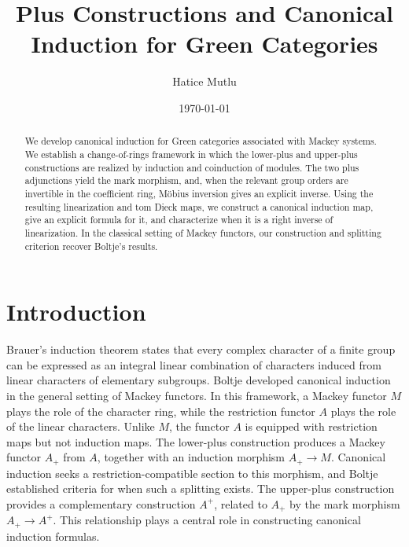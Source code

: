 \documentclass{amsart}
\title{Plus Constructions and Canonical Induction for Green Categories}
\author{Hatice Mutlu}
\date{\today}
\numberwithin{equation}{section}%
\theoremstyle{remark}
\theoremstyle{definition}
\begin{document}
\maketitle
\small

\begin{abstract}\normalsize
We develop canonical induction for Green categories associated with
Mackey systems. We establish a change-of-rings framework in which the
lower-plus and upper-plus constructions are realized by induction and
coinduction of modules. The two plus adjunctions yield the mark
morphism, and, when the relevant group orders are invertible in the
coefficient ring, M\"obius inversion gives an explicit inverse.
Using the resulting linearization and tom Dieck maps, we construct a
canonical induction map, give an explicit formula for it, and
characterize when it is a right inverse of linearization. In the 
classical setting of Mackey functors, our construction and splitting 
criterion recover Boltje's results.
\end{abstract}


%
\tableofcontents


\section{Introduction}
\label{sec:introduction}

Brauer's induction theorem states that every complex character of a
finite group can be expressed as an integral linear combination of
characters induced from linear characters of elementary subgroups.
Boltje \cite{Boltje98a} developed canonical induction in the general
setting of Mackey functors. In this framework, a Mackey functor $M$
plays the role of the character ring, while the restriction functor
$A$ plays the role of the linear characters. Unlike $M$, the functor
$A$ is equipped with restriction maps but not induction maps.
The lower-plus construction produces a Mackey functor $A_+$ from
$A$, together with an induction morphism $A_+\to M$.
Canonical induction seeks a restriction-compatible section
to this morphism, and Boltje established criteria for when
such a splitting exists.
 The upper-plus construction provides a complementary construction
$A^+$, related to $A_+$ by the mark morphism $A_+\to A^+$.
This relationship plays a central role in constructing canonical
induction formulas. 
\end{document}
